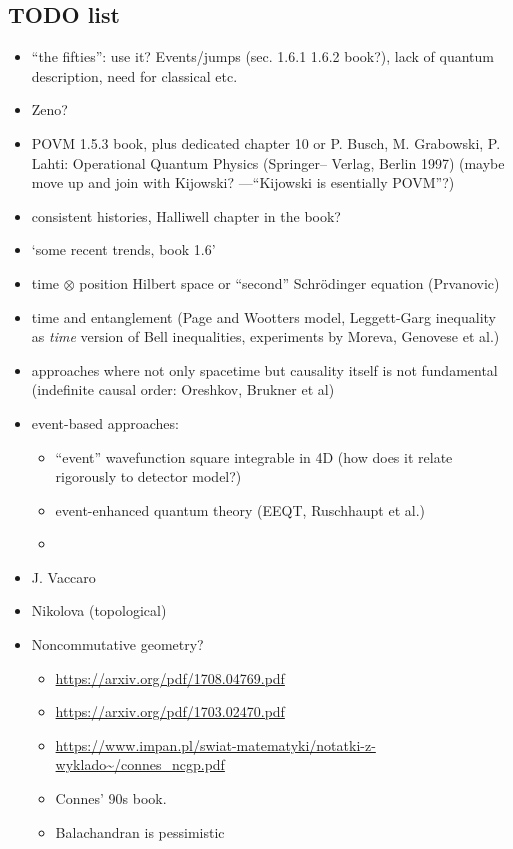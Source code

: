 \subsection*{TODO list}
\begin{itemize}
  \iftodo
  \item ``the fifties'': use it? Events/jumps (sec. 1.6.1 1.6.2 book?), lack of quantum description, need for classical etc.
  \fi
  \item Zeno?
  \item POVM 1.5.3 book, plus dedicated chapter 10 or P. Busch, M. Grabowski, P. Lahti: Operational Quantum Physics (Springer–
  Verlag, Berlin 1997) (maybe move up and join with Kijowski? ---``Kijowski is esentially POVM''?)
  \item consistent histories, Halliwell chapter in the book?
  \item `some recent trends, book 1.6'
  \item
      time $\otimes$ position Hilbert space or ``second'' Schr\"odinger equation (Prvanovic)
  \item time and entanglement (Page and Wootters model, Leggett-Garg inequality as \emph{time} version of Bell inequalities, experiments by Moreva, Genovese et al.)
  \item approaches where not only spacetime but causality itself is not fundamental (indefinite causal order: Oreshkov, Brukner et al)
  \item event-based approaches:
    \begin{itemize}
      \item ``event'' wavefunction square integrable in 4D (how does it relate rigorously to detector model?)
      \item event-enhanced quantum theory (EEQT, Ruschhaupt et al.)
      \item
    \end{itemize}
  \item J. Vaccaro
  \item Nikolova (topological)
  \item Noncommutative geometry?
  \begin{itemize}
    \item \url{https://arxiv.org/pdf/1708.04769.pdf}
    \item \url{https://arxiv.org/pdf/1703.02470.pdf}
    \item \url{https://www.impan.pl/swiat-matematyki/notatki-z-wyklado~/connes_ncgp.pdf}
    \item Connes' 90s book.
    \item Balachandran is pessimistic
  \end{itemize}
\end{itemize}
